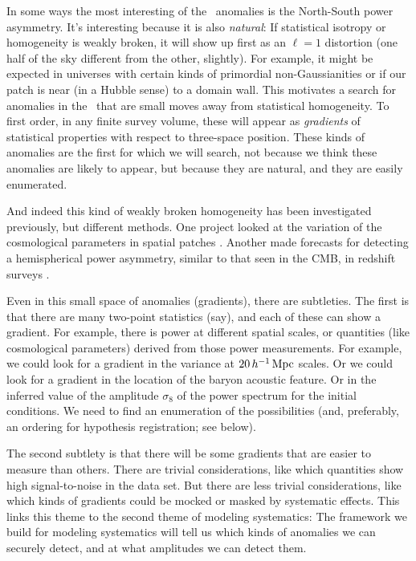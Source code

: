\documentclass[12pt, fullpage, letterpaper]{article}
\begin{document}
In some ways the most interesting of the \CMB\ anomalies is the
North-South power asymmetry. It's interesting because it is also
\emph{natural}: If statistical isotropy or homogeneity is weakly
broken, it will show up first as an $\ell=1$ distortion (one half of
the sky different from the other, slightly).
For example, it might be expected in universes with certain kinds
of primordial non-Gaussianities \citep{Dalal2008} or if our patch is
near (in a Hubble sense) to a domain wall.
This motivates a search for anomalies in the \LSS\ that are small
moves away from statistical homogeneity.
To first order, in any finite survey volume, these will appear as
\emph{gradients} of statistical properties with respect to three-space
position.
These kinds of anomalies are the first for which we will search, not
because we think these anomalies are likely to appear, but because they
are natural, and they are easily enumerated.

And indeed this kind of weakly broken homogeneity has been investigated previously,
but different methods.
One project looked at the variation of the cosmological parameters in spatial patches \citep{Mukherjee2018}.
Another made forecasts for detecting a hemispherical power asymmetry, similar to that seen in the CMB, in redshift surveys \citep{Zhai2017}.

Even in this small space of anomalies (gradients), there are subtleties. The first
is that there are many two-point statistics (say), and each of these can
show a gradient. For example, there is power at different spatial scales,
or quantities (like cosmological parameters) derived from those power
measurements. For example, we could look for a gradient in the variance at
$20\,h^{-1}\,{\mathrm{Mpc}}$ scales. Or we could look for a gradient in the location
of the baryon acoustic feature. Or in the inferred value of the amplitude
$\sigma_8$ of the power spectrum for the initial conditions.
We need to find an enumeration of the possibilities (and, preferably, an
ordering for hypothesis registration; see below).

The second subtlety is that there will be some gradients that are easier
to measure than others. There are trivial considerations, like which
quantities show high signal-to-noise in the data set. But there are less
trivial considerations, like which kinds of gradients could be mocked or
masked by systematic effects.
This links this theme to the second theme of modeling systematics:
The framework we build for modeling systematics will tell us which
kinds of anomalies we can securely detect, and at what amplitudes we
can detect them.
\end{document}
